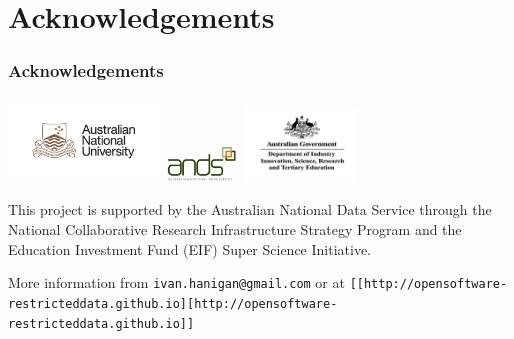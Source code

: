 \documentclass[bigger]{beamer}
\begin{document}
\section{Acknowledgements}
\label{sec-6}
\begin{frame}
\frametitle{Acknowledgements}
\label{sec-6-1}

\includegraphics[width=4cm]{ANU_LOGO_cmyk_56mm.png}
\includegraphics[width=2cm]{andslogo.pdf}
\includegraphics[width=3cm]{deptlogo.pdf} \\
\begin{footnotesize}
This project is supported by the Australian National Data Service through the National Collaborative Research Infrastructure Strategy Program and the Education Investment Fund (EIF) Super Science Initiative.

More information from \texttt{ivan.hanigan@gmail.com} or at \texttt{[[http://opensoftware-restricteddata.github.io][http://opensoftware-restricteddata.github.io]]}

\end{footnotesize}
\end{frame}
\end{document}
